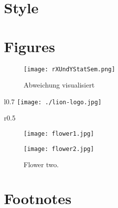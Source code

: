\section{Style}
\usepackage[doublespacing]{setspace} %

\section{Figures}

\begin{figure}[H]
  \centering\texttt{[image: rXUndYStatSem.png]}
  \caption{Abweichung visualisiert\cite{statistikSeminar}}
  \label{fig:rUndXY}
\end{figure}


\begin{wrapfigure}{l}{0.7\linewidth}
\texttt{[image: ./lion-logo.jpg]}
\caption{This is the former Share\LaTeX{} logo}
\end{wrapfigure}

\begin{wrapfigure}{r}{0.5\textwidth}
    \vspace{-25pt}
    \vspace{-20pt}
  \caption{Triangulation \cite{poleTagging}}
  \label{fig:triang}
    \vspace{-6pt}
\end{wrapfigure}

\begin{figure}[!tbp]
  \centering
  \begin{minipage}[b]{0.4\textwidth}
    \texttt{[image: flower1.jpg]}
    \caption{Flower one.}
  \end{minipage}
  \hfill
  \begin{minipage}[b]{0.4\textwidth}
    \texttt{[image: flower2.jpg]}
    \caption{Flower two.}
  \end{minipage}
\end{figure}


\section{Footnotes}

